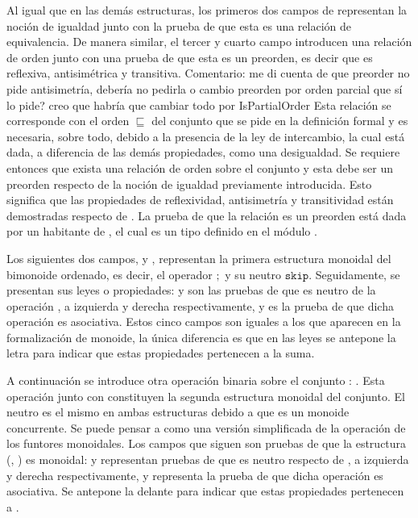 Al igual que en las demás estructuras, los primeros dos campos de  representan la noción de igualdad junto con la prueba de que esta es una relación de equivalencia. De manera similar, el tercer y cuarto campo introducen una relación de orden junto con una prueba de que esta es un preorden, es decir que es reflexiva, antisimétrica y transitiva. {\color{red} Comentario: me di cuenta de que preorder no pide antisimetría, debería no pedirla o cambio preorden por orden parcial que sí lo pide? creo que habría que cambiar todo por IsPartialOrder} Esta relación se corresponde con el orden $\sqsubseteq$ del conjunto que se pide en la definición formal y es necesaria, sobre todo, debido a la presencia de la ley de intercambio, la cual está dada, a diferencia de las demás propiedades, como una desigualdad. Se requiere entonces que exista una relación de orden sobre el conjunto  y esta debe ser un preorden respecto de la noción de igualdad previamente introducida. Esto significa que las propiedades de reflexividad, antisimetría y transitividad están demostradas respecto de . La prueba  de que la relación  es un preorden está dada por un habitante de , el cual es un tipo  definido en el módulo \href{https://agda.github.io/agda-stdlib/Relation.Binary.Structures.html}{}.

Los siguientes dos campos,  y , representan la primera estructura monoidal del bimonoide ordenado, es decir, el operador $;$ y su neutro $\mathtt{skip}$. Seguidamente, se presentan sus leyes o propiedades:  y  son las pruebas de que  es neutro de la operación , a izquierda y derecha respectivamente, y  es la prueba de que dicha operación es asociativa. Estos cinco campos son iguales a los que aparecen en la formalización de monoide, la única diferencia es que en las leyes se antepone la letra  para indicar que estas propiedades pertenecen a la suma. 

A continuación se introduce otra operación binaria sobre el conjunto : . Esta operación junto con  constituyen la segunda estructura monoidal del conjunto. El neutro es el mismo en ambas estructuras debido a que es un monoide concurrente. Se puede pensar a  como una versión simplificada de la operación  de los funtores monoidales. Los campos que siguen son pruebas de que la estructura (, ) es monoidal:  y  representan pruebas de que  es neutro respecto de , a izquierda y derecha respectivamente, y  representa la prueba de que dicha operación es asociativa. Se antepone la  delante para indicar que estas propiedades pertenecen a . 

